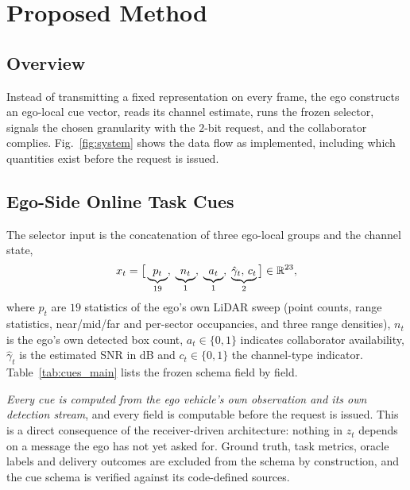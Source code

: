 \documentclass[journal]{IEEEtran}
\begin{document}
\section{Proposed Method}\label{sec:method}

\subsection{Overview}
Instead of transmitting a fixed representation on every frame, the ego constructs an ego-local cue
vector, reads its channel estimate, runs the frozen selector, signals the chosen granularity with
the $2$-bit request, and the collaborator complies. Fig.~\ref{fig:system} shows the data flow as
implemented, including which quantities exist before the request is issued.

\subsection{Ego-Side Online Task Cues}\label{sec:cues}
The selector input is the concatenation of three ego-local groups and the channel state,
\begin{equation}
x_t = \bigl[\,\underbrace{p_t}_{19},\; \underbrace{n_t}_{1},\; \underbrace{a_t}_{1},\;
\underbrace{\hat\gamma_t,\, c_t}_{2}\,\bigr] \in \mathbb{R}^{23},
\label{eq:cue}
\end{equation}
where $p_t$ are $19$ statistics of the ego's own LiDAR sweep (point counts, range statistics,
near/mid/far and per-sector occupancies, and three range densities), $n_t$ is the ego's own detected
box count, $a_t \in \{0,1\}$ indicates collaborator availability, $\hat\gamma_t$ is the estimated
SNR in dB and $c_t \in \{0,1\}$ the channel-type indicator. Table~\ref{tab:cues_main} lists the
frozen schema \CueName{} field by field.

\begin{table}[t]
\caption{The frozen cue schema \CueName{}. Fields $1$--$21$ are ego-local; $22$--$23$ are the
channel state. The source column gives the routine each field is computed by.}
\label{tab:cues_main}
\centering\footnotesize\setlength{\tabcolsep}{4pt}

\end{table}

\emph{Every cue is computed from the ego vehicle's own observation and its own detection stream}, and
every field is computable before the request is issued. This is a direct consequence of the
receiver-driven architecture: nothing in $z_t$ depends on a message the ego has not yet asked for.
Ground truth, task metrics, oracle labels and delivery outcomes are excluded from the schema by
construction, and the cue schema is verified against its code-defined sources.
\end{document}
